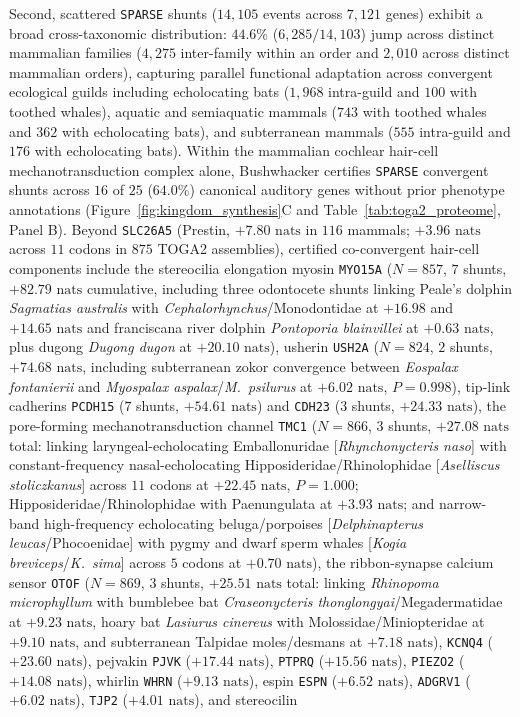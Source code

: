 \documentclass[11pt,a4paper]{article}
\begin{document}
Second, scattered \texttt{SPARSE} shunts ($14,105$ events across $7,121$ genes) exhibit a broad cross-taxonomic distribution: $44.6\%$ ($6,285 / 14,103$) jump across distinct mammalian families ($4,275$ inter-family within an order and $2,010$ across distinct mammalian orders), capturing parallel functional adaptation across convergent ecological guilds including echolocating bats ($1,968$ intra-guild and $100$ with toothed whales), aquatic and semiaquatic mammals ($743$ with toothed whales and $362$ with echolocating bats), and subterranean mammals ($555$ intra-guild and $176$ with echolocating bats). Within the mammalian cochlear hair-cell mechanotransduction complex alone, Bushwhacker certifies \texttt{SPARSE} convergent shunts across $16$ of $25$ ($64.0\%$) canonical auditory genes without prior phenotype annotations \citep{davies2012molecular,shen2012parallel} (Figure~\ref{fig:kingdom_synthesis}C and Table~\ref{tab:toga2_proteome}, Panel B). Beyond \texttt{SLC26A5} (Prestin, $+7.80\text{ nats}$ in $116$ mammals; $+3.96\text{ nats}$ across $11$ codons in $875$ TOGA2 assemblies), certified co-convergent hair-cell components include the stereocilia elongation myosin \texttt{MYO15A} ($N = 857$, $7$ shunts, $+82.79\text{ nats}$ cumulative, including three odontocete shunts linking Peale's dolphin \textit{Sagmatias australis} with \textit{Cephalorhynchus}/Monodontidae at $+16.98$ and $+14.65\text{ nats}$ and franciscana river dolphin \textit{Pontoporia blainvillei} at $+0.63\text{ nats}$, plus dugong \textit{Dugong dugon} at $+20.10\text{ nats}$), usherin \texttt{USH2A} ($N = 824$, $2$ shunts, $+74.68\text{ nats}$, including subterranean zokor convergence between \textit{Eospalax fontanierii} and \textit{Myospalax aspalax}/\textit{M.\ psilurus} at $+6.02\text{ nats}$, $P = 0.998$), tip-link cadherins \texttt{PCDH15} ($7$ shunts, $+54.61\text{ nats}$) and \texttt{CDH23} ($3$ shunts, $+24.33\text{ nats}$), the pore-forming mechanotransduction channel \texttt{TMC1} ($N = 866$, $3$ shunts, $+27.08\text{ nats}$ total: linking laryngeal-echolocating Emballonuridae [\textit{Rhynchonycteris naso}] with constant-frequency nasal-echolocating Hipposideridae/Rhinolophidae [\textit{Aselliscus stoliczkanus}] across $11$ codons at $+22.45\text{ nats}$, $P = 1.000$; Hipposideridae/Rhinolophidae with Paenungulata at $+3.93\text{ nats}$; and narrow-band high-frequency echolocating beluga/porpoises [\textit{Delphinapterus leucas}/Phocoenidae] with pygmy and dwarf sperm whales [\textit{Kogia breviceps}/\textit{K.\ sima}] across $5$ codons at $+0.70\text{ nats}$), the ribbon-synapse calcium sensor \texttt{OTOF} ($N = 869$, $3$ shunts, $+25.51\text{ nats}$ total: linking \textit{Rhinopoma microphyllum} with bumblebee bat \textit{Craseonycteris thonglongyai}/Megadermatidae at $+9.23\text{ nats}$, hoary bat \textit{Lasiurus cinereus} with Molossidae/Miniopteridae at $+9.10\text{ nats}$, and subterranean Talpidae moles/desmans at $+7.18\text{ nats}$), \texttt{KCNQ4} ($+23.60\text{ nats}$), pejvakin \texttt{PJVK} ($+17.44\text{ nats}$), \texttt{PTPRQ} ($+15.56\text{ nats}$), \texttt{PIEZO2} ($+14.08\text{ nats}$), whirlin \texttt{WHRN} ($+9.13\text{ nats}$), espin \texttt{ESPN} ($+6.52\text{ nats}$), \texttt{ADGRV1} ($+6.02\text{ nats}$), \texttt{TJP2} ($+4.01\text{ nats}$), and stereocilin 
\end{document}
